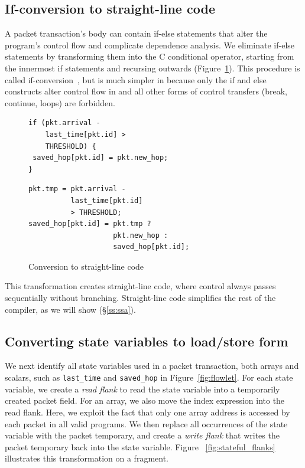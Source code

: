 \subsection{If-conversion to straight-line code}
A packet transaction's body can contain if-else statements that alter the
program's control flow and complicate dependence analysis. We eliminate if-else
statements by transforming them into the C conditional operator, starting from
the innermost if statements and recursing outwards
(Figure~\ref{fig:if_convert}). This procedure is called
if-conversion~\cite{if_conversion}, but is much simpler in \pktlanguage because
only the if and else constructs alter control flow in \pktlanguage and all
other forms of control transfers (break, continue, loops) are forbidden.
\begin{figure}[!t]
  \begin{minipage}{0.47\textwidth}
  \begin{small}
  \begin{lstlisting}[style=customc]
if (pkt.arrival -
    last_time[pkt.id] >
    THRESHOLD) {
 saved_hop[pkt.id] = pkt.new_hop;
}
  \end{lstlisting}
  \end{small}
  \end{minipage}
  \begin{minipage}{0.53\textwidth}
  \begin{small}
  \begin{lstlisting}[style=customc]
pkt.tmp = pkt.arrival -
          last_time[pkt.id]
          > THRESHOLD;
saved_hop[pkt.id] = pkt.tmp ?
                    pkt.new_hop :
                    saved_hop[pkt.id];
  \end{lstlisting}
  \end{small}
  \end{minipage}
\caption{Conversion to straight-line code}
\label{fig:if_convert}
\end{figure}

This transformation creates straight-line code, where control always passes
sequentially without branching. Straight-line code simplifies
the rest of the compiler, as we will show (\S\ref{ss:ssa}).

\subsection{Converting state variables to load/store form}

We next identify all state variables used in a packet transaction, both arrays
and scalars, such as \texttt{last\_time} and \texttt{saved\_hop} in
Figure~\ref{fig:flowlet}. For each state variable, we create a \textit{read
flank} to read the state variable into a temporarily created packet field. For
an array, we also move the index expression into the read flank. Here, we
exploit the fact that only one array address is accessed by each packet in all
valid \pktlanguage programs.  We then replace all occurrences of the state
variable with the packet temporary, and create a \textit{write flank} that
writes the packet temporary back into the state variable.  Figure
~\ref{fig:stateful_flanks} illustrates this transformation on a fragment.

